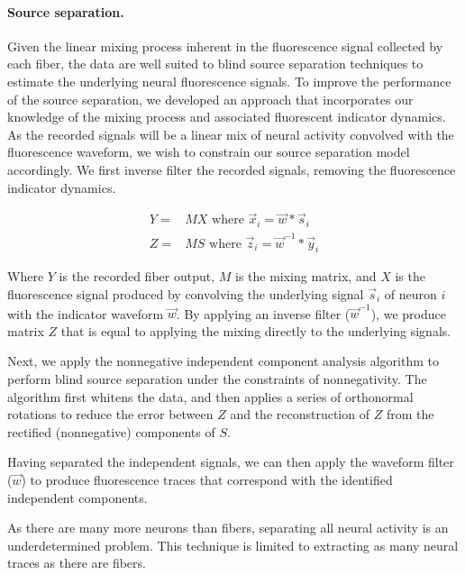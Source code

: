 \paragraph{Source separation.} Given the linear mixing process inherent in the fluorescence signal collected by each fiber, the data are well suited to blind source separation techniques to estimate the underlying neural fluorescence signals. To improve the performance of the source separation, we developed an approach that incorporates our knowledge of the mixing process and associated fluorescent indicator dynamics. As the recorded signals will be a linear mix of neural activity convolved with the fluorescence waveform, we wish to constrain our source separation model accordingly. We first inverse filter the recorded signals, removing the fluorescence indicator dynamics.

\begin{align}
Y = & M X \text{ where } \vec{x}_i = \vec{w} * \vec{s}_i \\
Z = & M S \text{ where } \vec{z}_i = \vec{w}^{-1} * \vec{y}_i
\end{align}

Where $Y$ is the recorded fiber output, $M$ is the mixing matrix, and $X$ is the fluorescence signal produced by convolving the underlying signal $\vec{s}_i$ of neuron $i$ with the indicator waveform $\vec{w}$. By applying an inverse filter ($\vec{w}^{-1}$), we produce matrix $Z$ that is equal to applying the mixing directly to the underlying signals.

Next, we apply the nonnegative independent component analysis algorithm \cite{Plumbley:2003dw} to perform blind source separation under the constraints of nonnegativity. The algorithm first whitens the data, and then applies a series of orthonormal rotations to reduce the error between $Z$ and the reconstruction of $Z$ from the rectified (nonnegative) components of $S$.

Having separated the independent signals, we can then apply the waveform filter ($\vec{w}$) to produce fluorescence traces that correspond with the identified independent components.

As there are many more neurons than fibers, separating all neural activity is an underdetermined problem. This technique is limited to extracting as many neural traces as there are fibers.


